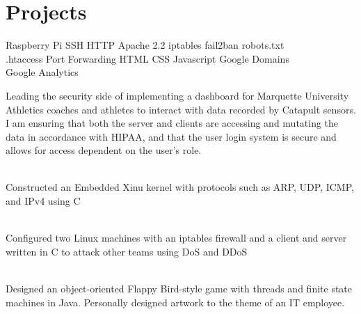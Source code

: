 \documentclass[letterpaper]{deedy-resume} %
\begin{document}
\begin{minipage}[t]{0.66\textwidth}
\section{Projects}

Raspberry Pi \textbullet{} SSH \textbullet{} HTTP \textbullet{} Apache 2.2 \textbullet{} iptables \textbullet{}  fail2ban \textbullet{} robots.txt \\
.htaccess \textbullet{} Port Forwarding \textbullet{} HTML \textbullet{} CSS \textbullet{} Javascript \textbullet{} Google Domains \\
Google Analytics

\sectionspace %

Leading the security side of implementing a dashboard for Marquette University Athletics coaches and athletes to interact with data recorded by Catapult sensors. I am ensuring that both the server and clients are accessing and mutating the data in accordance with HIPAA, and that the user login system is secure and allows for access dependent on the user's role.

\sectionspace %

\\
Constructed an Embedded Xinu kernel with protocols such as ARP, UDP, ICMP, and IPv4 using C

\sectionspace %

\\
Configured two Linux machines with an iptables firewall and a client and server written in C to attack other teams using DoS and DDoS

\sectionspace %

\\
Designed an object-oriented Flappy Bird-style game with threads and finite state machines in Java. Personally designed artwork to the theme of an IT employee.

\end{minipage} %
\end{document}

